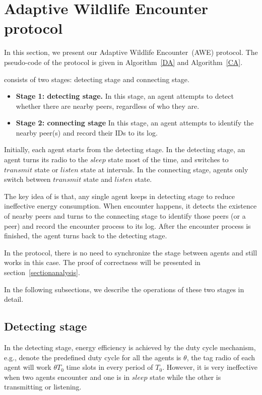 \section{Adaptive Wildlife Encounter protocol}
\label{sectionmodel}

In this section, we present our Adaptive Wildlife Encounter~(AWE) protocol.
The pseudo-code of the protocol is given in Algorithm~\ref{DA} and Algorithm~\ref{CA}.

{\pName} consists of two stages: detecting stage and 
connecting stage. 
\begin{itemize}
    \item \textbf{Stage 1: detecting stage.} In this stage, an agent attempts to
    detect whether there are nearby peers, regardless of who they are. 
    \item \textbf{Stage 2: connecting stage} In this stage, an agent attempts to 
    identify the nearby peer(s) and record their IDs to its log.
\end{itemize}

Initially, each agent starts from the detecting stage. 
In the detecting stage, an agent turns its radio to the $sleep$ state most of the time,
and switches to $transmit$ state or $listen$ state at intervals.
In the connecting stage, agents only switch between $transmit$ state 
and $listen$ state.

The key idea of {\pName} is that, any single agent keeps in detecting 
stage to reduce ineffective energy consumption. When encounter happens, 
it detects the existence of nearby peers and turns to the connecting stage 
to identify those peers (or a peer) and record the encounter process to its log. 
After the encounter process is finished, the agent turns back to the detecting stage.

\begin{remark}
    In the {\pName} protocol, there is no need to synchronize the stage between agents and
    {\pName} still works in this case. 
    The proof of correctness will be presented 
    in section~\ref{sectionanalysis}. 
\end{remark}

In the following subsections, we describe the operations of these two stages in detail. 

\subsection{Detecting stage}

In the detecting stage,  
energy efficiency is achieved by the duty cycle mechanism, 
e.g., denote the predefined duty cycle for 
all the agents is $\theta$, the tag radio of each agent will work
$\theta T_0$ time slots in every period of $T_0$. However, it is very ineffective
when two agents encounter and one is in $sleep$ state while the other is transmitting
or listening. 


